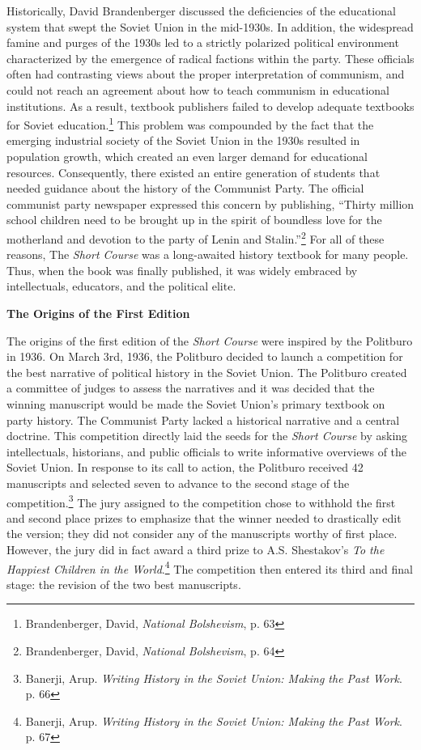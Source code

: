\documentclass[a4paper, twocolumn]{article}
\begin{document}
Historically, David Brandenberger discussed the deficiencies of the
educational system that swept the Soviet Union in the mid-1930s. In
addition, the widespread famine and purges of the 1930s led to a
strictly polarized political environment characterized by the
emergence of radical factions within the party. These officials often
had contrasting views about the proper interpretation of communism, and
could not reach an agreement about how to teach communism in
educational institutions. As a result, textbook publishers failed to
develop adequate textbooks for Soviet education.\footnote{ Brandenberger, David, \emph{National Bolshevism}, p. 63} This problem was
compounded by the fact that the emerging industrial society of the
Soviet Union in the 1930s resulted in population growth, which created
an even larger demand for educational resources. Consequently,
there existed an entire generation of students that needed guidance
about the history of the Communist Party. The official communist party
newspaper expressed this concern by publishing, “Thirty million
school children need to be brought up in the spirit of boundless love
for the motherland and devotion to the party of Lenin and Stalin.”\footnote{ Brandenberger, David, \emph{National Bolshevism}, p. 64}
For all of these reasons, The \emph{Short Course} was a long-awaited history
textbook for many people. Thus, when the book was finally published,
it was widely embraced by intellectuals, educators, and the political
elite.


\begin{center}\textbf{The Origins of the First Edition}\end{center}

The origins of the first edition of the \emph{Short Course} were inspired by
the Politburo in 1936. On March 3rd, 1936, the Politburo decided to
launch a competition for the best narrative of political history in
the Soviet Union. The Politburo created a committee of judges to
assess the narratives and it was decided that the winning manuscript
would be made the Soviet Union’s primary textbook on party
history. The Communist Party lacked a historical narrative and a central
doctrine.
  This competition directly laid the seeds for the \emph{Short Course} by
  asking intellectuals, historians, and public officials to write
  informative overviews of the Soviet Union. In response to its call
  to action, the Politburo received 42 manuscripts and selected seven
  to advance to the second stage of the competition.\footnote{Banerji, Arup. \emph{Writing History in the Soviet Union: Making the Past Work}. p. 66} The jury
  assigned to the competition chose to withhold the first and second
  place prizes to emphasize that the winner needed to drastically edit
  the version; they did not consider any of the manuscripts worthy of
  first place.  However, the jury did in fact award a third prize to
  A.S. Shestakov’s \emph{To the Happiest Children in the World}.\footnote{Banerji, Arup. \emph{Writing History in the Soviet Union: Making the Past Work}. p. 67} The
  competition then entered its third and final stage: the revision of
  the two best manuscripts.
\end{document}
